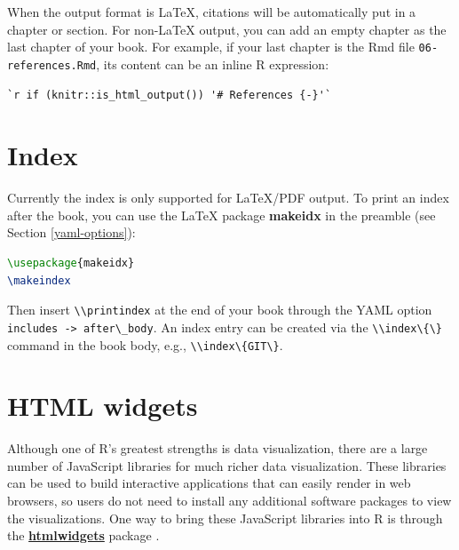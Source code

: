\documentclass[doctor,openright,twoside]{sjtuthesis}
\newcommand{\passthrough}[1]{#1}
\theoremstyle{plain}
\theoremstyle{definition}
\theoremstyle{remark}
\theoremstyle{ocrenumbox}
\theoremstyle{plain}
\begin{document}
When the output format is LaTeX, citations will be automatically put in a chapter or section. For non-LaTeX output, you can add an empty chapter as the last chapter of your book. For example, if your last chapter is the Rmd file \passthrough{\lstinline!06-references.Rmd!}, its content can be an inline R expression:

\begin{lstlisting}
`r if (knitr::is_html_output()) '# References {-}'`
\end{lstlisting}

\hypertarget{latex-index}{%
\section{Index}\label{latex-index}}

Currently the index is only supported for LaTeX/PDF output. To print an index after the book, you can use the LaTeX package \textbf{makeidx} in the preamble (see Section \ref{yaml-options}):

\begin{lstlisting}[language=TeX]
\usepackage{makeidx}
\makeindex
\end{lstlisting}

Then insert \passthrough{\lstinline!\\printindex!} at the end of your book through the YAML option \passthrough{\lstinline!includes -> after\_body!}. An index entry can be created via the \passthrough{\lstinline!\\index\{\}!} command in the book body, e.g., \passthrough{\lstinline!\\index\{GIT\}!}.

\hypertarget{html-widgets}{%
\section{HTML widgets}\label{html-widgets}}

Although one of R's greatest strengths is data visualization, there are a large number of JavaScript libraries for much richer data visualization. These libraries can be used to build interactive applications that can easily render in web browsers, so users do not need to install any additional software packages to view the visualizations. One way to bring these JavaScript libraries into R is through the \href{http://htmlwidgets.org}{\textbf{htmlwidgets}} package \autocite{R-htmlwidgets}.
\end{document}
